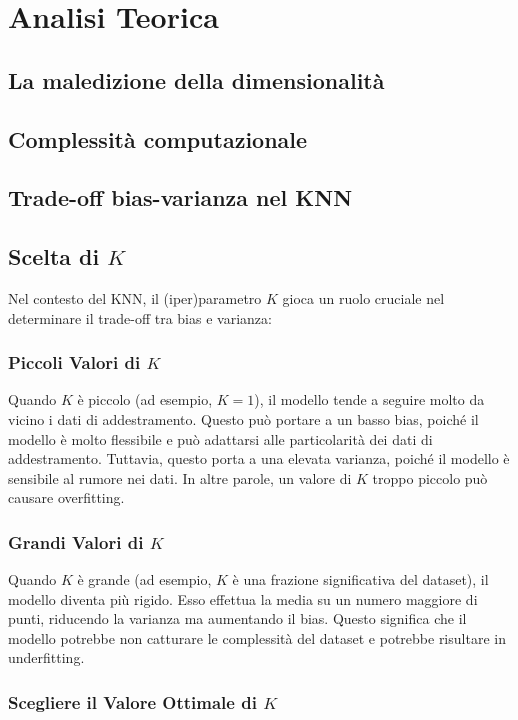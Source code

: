 \section{Analisi Teorica}
\subsection{La maledizione della dimensionalità}
\subsection{Complessità computazionale}
\subsection{Trade-off bias-varianza nel KNN}
\subsection{Scelta di \( K \)}

Nel contesto del KNN, il (iper)parametro $K$ gioca un ruolo cruciale nel determinare il trade-off tra bias e varianza:

\subsubsection{Piccoli Valori di $K$}

Quando $K$ è piccolo (ad esempio, $K=1$), il modello tende a seguire 
molto da vicino i dati di addestramento. Questo può portare a un basso bias, 
poiché il modello è molto flessibile e può adattarsi alle particolarità dei dati 
di addestramento. Tuttavia, questo porta a una elevata varianza, poiché il modello 
è sensibile al rumore nei dati. In altre parole, un valore di $K$ troppo piccolo può 
causare overfitting.

\subsubsection{Grandi Valori di $K$}

Quando $K$ è grande (ad esempio, $K$ è una frazione significativa del dataset), 
il modello diventa più rigido. Esso effettua la media su un numero maggiore di punti, 
riducendo la varianza ma aumentando il bias. Questo significa che il modello potrebbe 
non catturare le complessità del dataset e potrebbe risultare in underfitting.

\subsubsection{Scegliere il Valore Ottimale di $K$}


